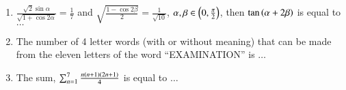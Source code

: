 \documentclass[journal]{IEEEtran}
\begin{document}
\begin{enumerate}
    \item $\frac{\sqrt{2}\sin\alpha}{\sqrt{1 + \cos2\alpha}} = \frac{1}{7}$ and $\sqrt{\frac{1-\cos2\beta}{2}} = \frac{1}{\sqrt{10}}$, $\alpha, \beta \in \left(0, \frac{\pi}{2}\right)$, then $\tan\left(\alpha + 2\beta\right)$ is equal to $\ldots$\\
    
    \item The number of 4 letter words (with or without meaning) that can be made from the eleven letters of the word ``EXAMINATION'' is $\ldots$\\
    
    \item The sum, $\sum_{n=1}^{7}\frac{n\left(n+1\right)\left(2n+1\right)}{4}$ is equal to $\ldots$\\
\end{enumerate}
\end{document}
